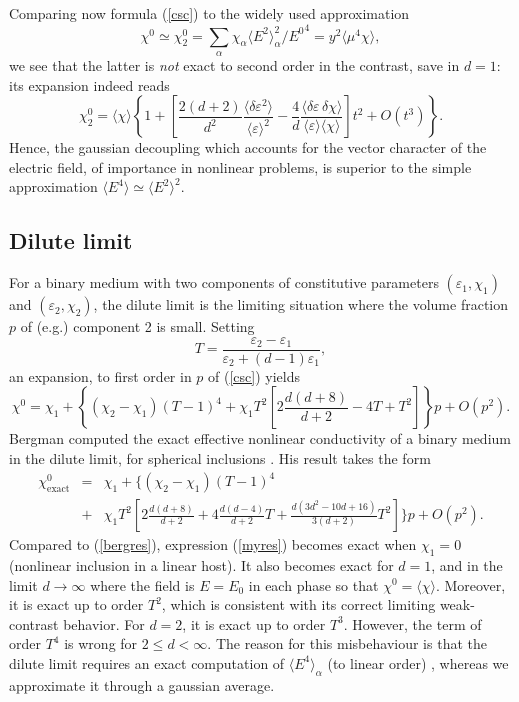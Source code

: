 Comparing now formula (\ref{csc}) to the widely used approximation
\begin{equation}
\label{chi02}
\chi^0\simeq\chi^0_2=\sum_\alpha \chi_\alpha
\langle E^2\rangle_\alpha^2/{E^0}^4=y^2\langle \mu^4\chi\rangle,
\end{equation}
we see that the latter is {\em not} exact to second order
in the contrast, save in $d=1$: its expansion indeed reads
\begin{equation}
\chi^0_2=\langle\chi\rangle
\left\{1+\left[\frac{2(d+2)}{d^2}\frac{\langle\delta\varepsilon^2\rangle} {\langle\varepsilon\rangle^2}-\frac{4}{d} \frac{\langle\delta\varepsilon\,\delta\chi\rangle} {\langle\varepsilon\rangle\langle\chi\rangle}\right]t^2+O(t^3)\right\}.
\end{equation}
Hence, the gaussian decoupling which accounts for the vector
character of the electric field, of importance in nonlinear
problems, is superior to the simple approximation $\langle
E^4\rangle\simeq \langle E^2\rangle^2$.

\subsection{Dilute limit}
For a binary medium with two components of constitutive
parameters $(\varepsilon_1,\chi_1)$ and $(\varepsilon_2,\chi_2)$,
the dilute limit is the limiting situation where the volume
fraction $p$ of (e.g.) component 2 is small.
Setting
\begin{equation}
T=\frac{\varepsilon_2-\varepsilon_1}{\varepsilon_2+(d-1)\varepsilon_1},
\end{equation}
an expansion, to first order in $p$ of (\ref{csc}) yields
\begin{equation}
\label{myres}
\chi^0=\chi_1+\left\{(\chi_2-\chi_1)
(T-1)^4+\chi_1T^2\left[2\frac{d(d+8)}{d+2}-4T+T^2\right]\right\}p+O(p^2).
\end{equation}
Bergman computed the exact effective nonlinear
conductivity of a binary medium in the dilute limit,
for spherical inclusions \cite{BERG89,ZHAN94}. His result takes the form
\begin{eqnarray}
\chi^0_{\text{exact}}&=&
\chi_1+\biggl\{(\chi_2-\chi_1) (T-1)^4\nonumber\\
\label{bergres}
&+&\chi_1T^2\left[2\frac{d(d+8)}{d+2} +4\frac{d(d-4)}{d+2}T+\frac{d(3d^2-10d+16)}{3(d+2)}T^2\right]\biggr\}p+O(p^2).
\end{eqnarray}
Compared to (\ref{bergres}), expression (\ref{myres})
becomes exact when $\chi_1=0$ (nonlinear inclusion in
a linear host). It also becomes exact for $d=1$, and
in the limit $d\to\infty$ where the field is $E=E_0$
in each phase so that $\chi^0=\langle \chi\rangle$.
Moreover, it is exact up to order $T^2$, which is
consistent with its correct limiting weak-contrast
behavior. For $d=2$, it is exact up to order $T^3$.
However, the term of order $T^4$ is wrong for
$2\le d<\infty$.
The reason for this misbehaviour is that the dilute limit requires
an exact computation of $\langle E^4\rangle_\alpha$ (to linear order)
\cite{BERG89}, whereas we approximate it through a gaussian average.

